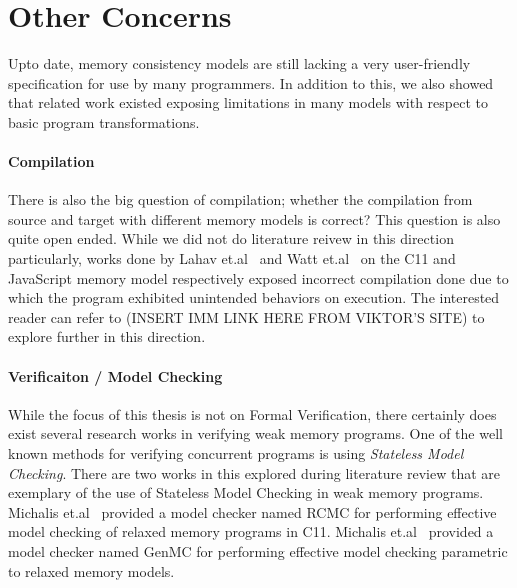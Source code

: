 \section{Other Concerns}

    Upto date, memory consistency models are still lacking a very user-friendly specification for use by many programmers. 
    In addition to this, we also showed that related work existed exposing limitations in many models with respect to basic program transformations.
    
    \paragraph{Compilation}
    There is also the big question of compilation; whether the compilation from source and target with different memory models is correct? This question is also quite open ended. While we did not do literature reivew in this direction particularly, works done by Lahav et.al~\cite{Lahav} and Watt et.al~\cite{Watt} on the C11 and JavaScript memory model respectively exposed incorrect compilation done due to which the program exhibited unintended behaviors on execution. 
    The interested reader can refer to (INSERT IMM LINK HERE FROM VIKTOR'S SITE) to explore further in this direction.
    
    \paragraph{Verificaiton / Model Checking}
    While the focus of this thesis is not on Formal Verification, there certainly does exist several research works in verifying weak memory programs. 
    One of the well known methods for verifying concurrent programs is using \textit{Stateless Model Checking}. 
    There are two works in this explored during literature review that are exemplary of the use of Stateless Model Checking in weak memory programs.
    Michalis et.al~\cite{Michalis1} provided a model checker named RCMC for performing effective model checking of relaxed memory programs in C11. 
    Michalis et.al~\cite{Michalis2} provided a model checker named GenMC for performing effective model checking parametric to relaxed memory models. 
    
